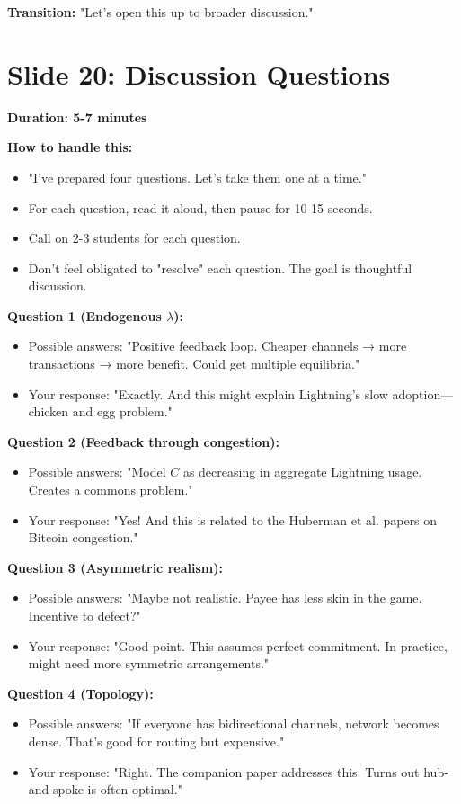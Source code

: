 \documentclass[11pt]{article}
\begin{document}
\textbf{Transition:} "Let's open this up to broader discussion."

\section*{Slide 20: Discussion Questions}

\textbf{Duration: 5-7 minutes}

\textbf{How to handle this:}
\begin{itemize}
    \item "I've prepared four questions. Let's take them one at a time."
    \item For each question, read it aloud, then pause for 10-15 seconds.
    \item Call on 2-3 students for each question.
    \item Don't feel obligated to "resolve" each question. The goal is thoughtful discussion.
\end{itemize}

\textbf{Question 1 (Endogenous $\lambda$):}
\begin{itemize}
    \item Possible answers: "Positive feedback loop. Cheaper channels → more transactions → more benefit. Could get multiple equilibria."
    \item Your response: "Exactly. And this might explain Lightning's slow adoption—chicken and egg problem."
\end{itemize}

\textbf{Question 2 (Feedback through congestion):}
\begin{itemize}
    \item Possible answers: "Model $C$ as decreasing in aggregate Lightning usage. Creates a commons problem."
    \item Your response: "Yes! And this is related to the Huberman et al. papers on Bitcoin congestion."
\end{itemize}

\textbf{Question 3 (Asymmetric realism):}
\begin{itemize}
    \item Possible answers: "Maybe not realistic. Payee has less skin in the game. Incentive to defect?"
    \item Your response: "Good point. This assumes perfect commitment. In practice, might need more symmetric arrangements."
\end{itemize}

\textbf{Question 4 (Topology):}
\begin{itemize}
    \item Possible answers: "If everyone has bidirectional channels, network becomes dense. That's good for routing but expensive."
    \item Your response: "Right. The companion paper addresses this. Turns out hub-and-spoke is often optimal."
\end{itemize}
\end{document}

